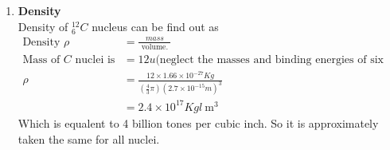 \begin{enumerate}
\begin{enumerate}
\end{enumerate}
\item \textbf{Density}\\
Density of $^{12}_6C$ nucleus can be find out as
\begin{align*}
\text{Density } \rho &=\frac{mass}{\text { volume. }}\\
\text{Mass of $C$ nuclei is }&=12 u\text{(neglect the masses and binding energies of six electrons)}\\
\rho&=\frac{12\times1.66\times10^{-27}Kg}{\left(\frac{4}{3}\pi \right)\left(2.7\times 10^{-15} m \right)^3  }\\
&=2.4 \times 10^{17} Kg l \mathrm{~m}^{3}
\end{align*}
Which is equalent to 4 billion tones per cubic inch. So it is approximately taken the same for all nuclei.
\begin{center}
	\framebox{
		\parbox[t][0.5cm]{3.5cm}{
			
			\addvspace{-0.5cm} \centering
			
}}
\end{center}
\end{enumerate}
